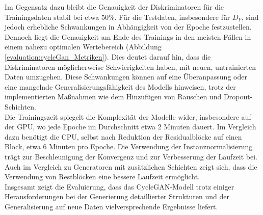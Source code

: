 Im Gegensatz dazu bleibt die Genauigkeit der Diskriminatoren für die Trainingsdaten stabil bei etwa $50\%$. Für die Testdaten, insbesondere für $D_Y$, sind jedoch erhebliche Schwankungen in Abhängigkeit von der Epoche festzustellen. Dennoch liegt die Genauigkeit am Ende des Trainings in den meisten Fällen in einem nahezu optimalen Wertebereich (Abbildung \ref{evaluation:cycleGan_Metriken}). Dies deutet darauf hin, dass die Diskriminatoren möglicherweise Schwierigkeiten haben, mit neuen, untrainierten Daten umzugehen. Diese Schwankungen können auf eine Überanpassung oder eine mangelnde Generalisierungsfähigkeit des Modells hinweisen, trotz der implementierten Maßnahmen wie dem Hinzufügen von Rauschen und Dropout-Schichten.\\\newline
Die Trainingszeit spiegelt die Komplexität der Modelle wider, insbesondere auf der GPU, wo jede Epoche im Durchschnitt etwa 2 Minuten dauert. Im Vergleich dazu benötigt die CPU, selbst nach Reduktion der Residualblöcke auf einen Block, etwa 6 Minuten pro Epoche. Die Verwendung der Instanznormalisierung trägt zur Beschleunigung der Konvergenz und zur Verbesserung der Laufzeit bei. Auch im Vergleich zu Generatoren mit zusätzlichen Schichten zeigt sich, dass die Verwendung von Restblöcken eine bessere Laufzeit ermöglicht. 
\\\newline
Insgesamt zeigt die Evaluierung, dass das CycleGAN-Modell trotz einiger Herausforderungen bei der Generierung detaillierter Strukturen und der Generalisierung auf neue Daten vielversprechende Ergebnisse liefert.